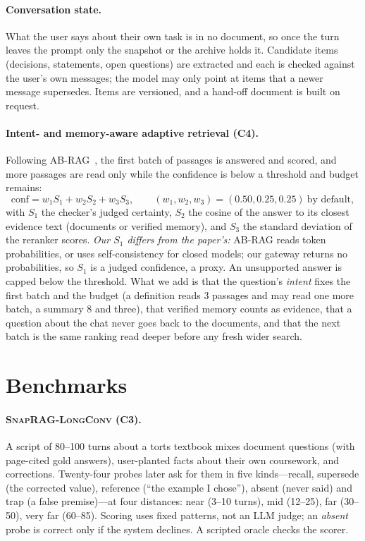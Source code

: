 \documentclass[10pt,twocolumn]{article}
\newcommand{\bench}{\textsc{SnapRAG-LongConv}}
\begin{document}
\paragraph{Conversation state.}
What the user says about their own task is in no document, so once the turn leaves the prompt only the snapshot or the archive holds it. Candidate items (decisions, statements, open questions) are extracted and each is checked against the user's own messages; the model may only point at items that a newer message supersedes. Items are versioned, and a hand-off document is built on request.

\paragraph{Intent- and memory-aware adaptive retrieval (C4).}
Following AB-RAG~\cite{kamthan2026abrag}, the first batch of passages is answered and scored, and more passages are read only while the confidence is below a threshold and budget remains:
\[
\mathrm{conf}=w_1 S_1 + w_2 S_2 + w_3 S_3,\qquad (w_1,w_2,w_3)=(0.50,0.25,0.25)\ \text{by default},
\]
with $S_1$ the checker's judged certainty, $S_2$ the cosine of the answer to its closest evidence text (documents or verified memory), and $S_3$ the standard deviation of the reranker scores. \emph{Our $S_1$ differs from the paper's:} AB-RAG reads token probabilities, or uses self-consistency for closed models; our gateway returns no probabilities, so $S_1$ is a judged confidence, a proxy. An unsupported answer is capped below the threshold. What we add is that the question's \emph{intent} fixes the first batch and the budget (a definition reads 3 passages and may read one more batch, a summary 8 and three), that verified memory counts as evidence, that a question about the chat never goes back to the documents, and that the next batch is the same ranking read deeper before any fresh wider search.

\section{Benchmarks}
\paragraph{\bench{} (C3).}\label{sec:longconv}
A script of 80--100 turns about a torts textbook mixes document questions (with page-cited gold answers), user-planted facts about their own coursework, and corrections. Twenty-four probes later ask for them in five kinds---recall, supersede (the corrected value), reference (``the example I chose''), absent (never said) and trap (a false premise)---at four distances: near (3--10 turns), mid (12--25), far (30--50), very far (60--85). Scoring uses fixed patterns, not an LLM judge; an \emph{absent} probe is correct only if the system declines. A scripted oracle checks the scorer.
\end{document}
